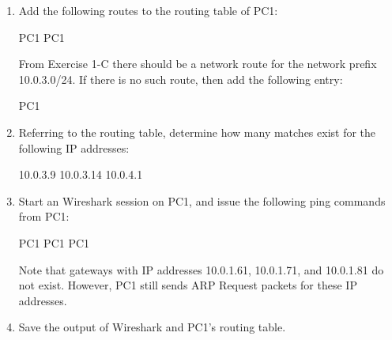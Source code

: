 \begin{enumerate}
	\item Add the following routes to the routing table of PC1:
		\begin{cmdblock}
	PC1%
	PC1%
		\end{cmdblock}
		From Exercise 1-C there should be a network route for the network prefix 10.0.3.0/24. If there is no such route, then add the following entry:
		\begin{cmdblock}
	PC1%
		\end{cmdblock}
	\item Referring to the routing table, determine how many matches exist for the following IP addresses:
		\begin{cmdblock}
	10.0.3.9 
	10.0.3.14
	10.0.4.1
		\end{cmdblock}
	\item Start an Wireshark session on PC1, and issue the following ping commands from PC1:
		\begin{cmdblock}
	PC1%
	PC1%
	PC1%
		\end{cmdblock}

		Note that gateways with IP addresses 10.0.1.61, 10.0.1.71, and 10.0.1.81 do not exist. However, PC1 still sends ARP Request packets for these IP addresses.
	\item Save the output of Wireshark and PC1’s routing table.
\end{enumerate}

\begin{questions}
\end{questions}
	

